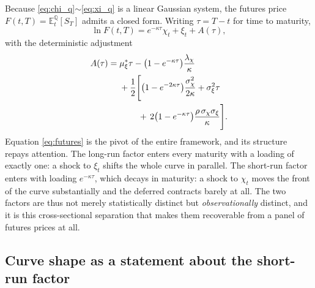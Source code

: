 \documentclass[journal]{IEEEtran}
\newcommand{\rng}{\ensuremath{\sim}}
\begin{document}
Because \eqref{eq:chi_q}\rng{}\eqref{eq:xi_q} is a linear Gaussian system, the futures price $F(t,T) = \mathbb{E}^{\mathbb{Q}}_t[S_T]$ admits a closed form. Writing $\tau = T - t$ for time to maturity,
%
\begin{equation}
  \ln F(t,T) = e^{-\kappa\tau}\chi_t + \xi_t + A(\tau) ,
  \label{eq:futures}
\end{equation}
%
with the deterministic adjustment
%
\begin{equation}
  \begin{aligned}
    A(\tau) = {}& \mu_\xi^{*}\tau
      - \bigl(1 - e^{-\kappa\tau}\bigr)\frac{\lambda_\chi}{\kappa} \\
      &+ \frac{1}{2}\Biggl[
          \bigl(1 - e^{-2\kappa\tau}\bigr)\frac{\sigma_\chi^{2}}{2\kappa}
          + \sigma_\xi^{2}\tau \\
      &\hspace{2.2em}
          + \,2\bigl(1 - e^{-\kappa\tau}\bigr)
            \frac{\rho\,\sigma_\chi\sigma_\xi}{\kappa}
        \Biggr] .
  \end{aligned}
  \label{eq:Atau}
\end{equation}
%
Equation \eqref{eq:futures} is the pivot of the entire framework, and its structure repays attention. The long-run factor enters every maturity with a loading of exactly one: a shock to $\xi_t$ shifts the whole curve in parallel. The short-run factor enters with loading $e^{-\kappa\tau}$, which decays in maturity: a shock to $\chi_t$ moves the front of the curve substantially and the deferred contracts barely at all. The two factors are thus not merely statistically distinct but \emph{observationally} distinct, and it is this cross-sectional separation that makes them recoverable from a panel of futures prices at all.

\subsection{Curve shape as a statement about the short-run factor}
\label{sec:slope}
\end{document}

